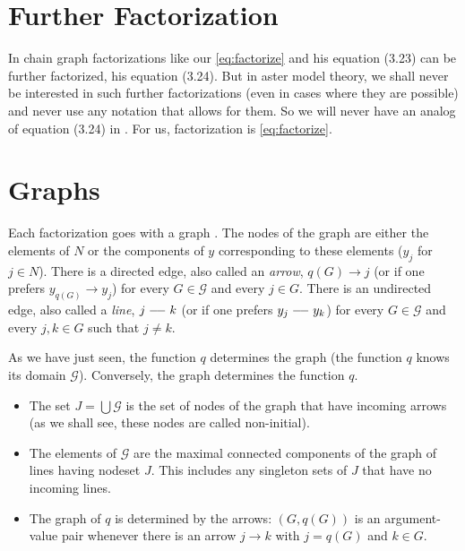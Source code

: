 \section{Further Factorization}

In \citet{lauritzen} chain graph factorizations like our \eqref{eq:factorize}
and his equation (3.23) can be further factorized, his equation (3.24).
But in aster model theory, we shall never be interested in such further
factorizations (even in cases where they are possible) and never use any
notation that allows for them.  So we will never have an analog of equation
(3.24) in \citet{lauritzen}.  For us, factorization is \eqref{eq:factorize}.

\section{Graphs}

Each factorization goes with a graph \citep[Section~3.2.3]{lauritzen}.
The nodes of the graph are either the elements of $N$ or the components
of $y$ corresponding to these elements ($y_j$ for $j \in N$).
There is a directed edge, also called an \emph{arrow},
$q(G) \longrightarrow j$ (or if one prefers $y_{q(G)} \longrightarrow y_j$)
for every $G \in \mathcal{G}$ and every $j \in G$.
There is an undirected edge, also called a \emph{line},
$j \myline k$ (or if one prefers $y_j \myline y_k$)
for every $G \in \mathcal{G}$ and every $j, k \in G$ such that $j \neq k$.

As we have just seen, the function $q$ determines the graph
(the function $q$ knows its domain $\mathcal{G}$).
Conversely, the graph determines the function $q$.
\begin{itemize}
\item The set $J = \bigcup \mathcal{G}$ is the set of nodes of the graph
    that have incoming arrows (as we shall see, these nodes are called
    non-initial).
\item The elements of $\mathcal{G}$ are the maximal connected components
    of the graph of lines having nodeset $J$.
    This includes any singleton sets of $J$ that have no incoming lines.
\item The graph of $q$ is determined by the arrows: $(G, q(G))$ is an
    argument-value pair whenever there is an arrow $j \longrightarrow k$
    with $j = q(G)$ and $k \in G$.
\end{itemize}

